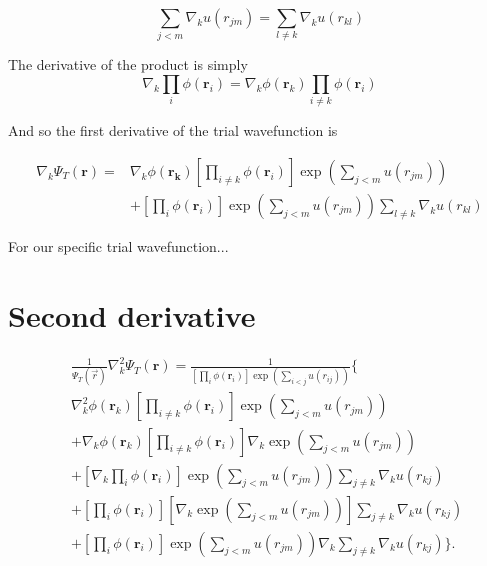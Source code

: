 \documentclass[
    a4paper, aps, twocolumn, floatfix, superscriptaddress,
    nofootinbib]{revtex4-1}
\begin{document}
\begin{appendices}
\begin{equation}
    \sum_{j<m }\nabla_k  u(r_{jm}) = \sum_{l\neq k } \nabla_k u(r_{kl})
\end{equation}

The derivative of the product is simply 
\begin{equation*}
    \nabla_k \prod_{i}\phi(\boldsymbol{r}_i) = \nabla_k \phi(\boldsymbol{r}_k) \prod_{i \neq k} \phi(\boldsymbol{r}_i)
\end{equation*}

And so the first derivative of the trial wavefunction is


\begin{align*}
    \nabla_k \Psi_T(\boldsymbol{r}) =& \nabla_k \phi(\boldsymbol{r_k}) \left[\prod_{i \neq k} \phi(\boldsymbol{r}_i)\right] \exp\left(\sum_{j<m} u(r_{jm})\right) \\
    &+ \left[\prod_i \phi(\boldsymbol{r}_i)\right]\exp \left(\sum_{j<m} u(r_{jm})\right) \sum_{l\neq k} \nabla_k u(r_{kl})
\end{align*}

For our specific trial wavefunction...

\section{Second derivative}

\begin{align}
   & \frac{1}{\Psi_T(\vec r)} \nabla^{2}_{k} \Psi_{T}(\boldsymbol{r}) = \frac{1}{\left[\prod_{i}\phi(\boldsymbol{r}_i)\right]\exp\left({\sum^{}_{i<j} u(r_{ij})}\right)} \Bigg\{ \\ &\nabla^{2}_{k}\phi(\boldsymbol{r}_k)\left[ \prod_{i \neq k} \phi(\boldsymbol{r}_i) \right] \exp\left(\sum_{j<m} u(r_{jm}) \right) \tag{i}\label{eq:i} \\
    &+\nabla_{k}\phi(\boldsymbol{r}_k)\left[ \prod_{i \neq k} \phi(\boldsymbol{r}_i) \right] \nabla_{k}\exp\left(\sum_{j<m} u(r_{jm})\right) \tag{ii}\label{eq:ii}\\
    &+\left[\nabla_k \prod_{i} \phi(\boldsymbol{r}_i)\right]  \exp\left(\sum_{j<m} u(r_{jm})\right) \sum_{j\neq k} \nabla_{k} 
    u(r_{kj})  \tag{iii}\label{eq:iii}
    \\\
    &+\left[\prod_{i} \phi(\boldsymbol{r}_i)\right] \left[ \nabla_k \exp\left(\sum_{j<m} u(r_{jm})\right) \right] \sum_{j\neq k} \nabla_{k} u(r_{kj})  \tag{iv}\label{eq:iv}\\
    &+
    \left[\prod_{i} \phi(\boldsymbol{r}_i)\right] \exp\left(\sum_{j<m} u(r_{jm})\right) \nabla_k \sum_{j\neq k} \nabla_{k} u(r_{kj}) \Bigg\} \Bigg. \tag{v}\label{eq:v}
\end{align}





\end{appendices}
\end{document}
